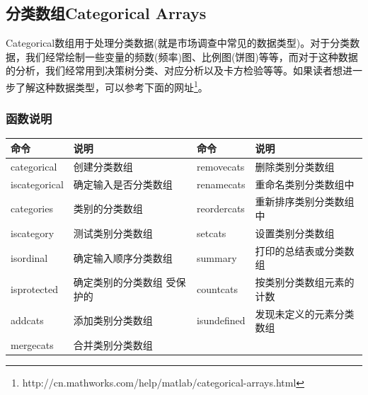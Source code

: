    \subsection{分类数组Categorical Arrays}
        \par
        Categorical数组用于处理分类数据(就是市场调查中常见的数据类型)。对于分类数据，我们经常绘制一些变量的频数(频率)图、比例图(饼图)等等，而对于这种数据的分析，我们经常用到决策树分类、对应分析以及卡方检验等等。如果读者想进一步了解这种数据类型，可以参考下面的网址\footnote{http://cn.mathworks.com/help/matlab/categorical-arrays.html}。
        \subsubsection{函数说明}
            \begin{table}[H]
            \centering
                \begin{tabularx}{\textwidth}{lXlX}
                \toprule
             命令& 说明& 命令& 说明\\\midrule
            categorical & 创建分类数组 & removecats & 删除类别分类数组\\
            iscategorical  & 确定输入是否分类数组&renamecats & 重命名类别分类数组中\\
            categories & 类别的分类数组&reordercats & 重新排序类别分类数组中\\
            iscategory & 测试类别分类数组&setcats & 设置类别分类数组\\
            isordinal & 确定输入顺序分类数组&summary & 打印的总结表或分类数组\\
            isprotected&确定类别的分类数组 受保护的&countcats & 按类别分类数组元素的计数\\
            addcats & 添加类别分类数组&isundefined & 发现未定义的元素分类数组\\
            mergecats & 合并类别分类数组&{}&{}\\
                \bottomrule
            \end{tabularx}
            \end{table}
